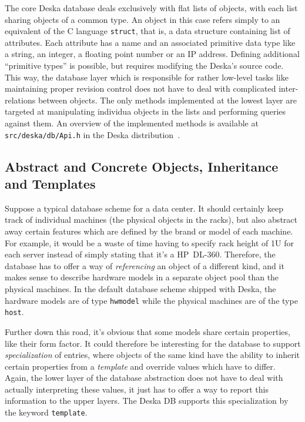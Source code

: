 \documentclass[a4paper]{jpconf}
\begin{document}
The core Deska database deals exclusively with flat lists of objects, with each list sharing objects of a common type.  An object in this case refers simply to an
equivalent of the C language {\tt struct}, that is, a data structure containing list of attributes.  Each attribute has a name and an
associated primitive data type like a string, an integer, a floating point number or an IP address.  Defining additional ``primitive
types'' is possible, but requires modifying the Deska's source code.  This way, the database layer which is responsible for rather
low-level tasks like maintaining proper revision control does not have to deal with complicated inter-relations between objects.  The
only methods implemented at the lowest layer are targeted at manipulating individua objects in the lists and performing queries against
them.  An overview of the implemented methods is available at {\tt src/deska/db/Api.h} in the Deska distribution~\cite{deska-project}.

\subsection{Abstract and Concrete Objects, Inheritance and Templates}

Suppose a typical database scheme for a data center.  It should certainly keep track of individual machines (the physical objects in
the racks), but also abstract away certain features which are defined by the brand or model of each machine.  For example, it would be
a waste of time having to specify rack height of 1U for each server instead of simply stating that it's a HP~DL-360.  Therefore, the
database has to offer a way of {\em referencing} an object of a different kind, and it makes sense to describe hardware models in a
separate object pool than the physical machines.  In the default database scheme shipped with Deska, the hardware models are of type
{\tt hwmodel} while the physical machines are of the type {\tt host}.

Further down this road, it's obvious that some models share certain properties, like their form factor.  It could therefore be
interesting for the database to support {\em specialization} of entries, where objects of the same kind have the ability to inherit
certain properties from a {\em template} and override values which have to differ.  Again, the lower layer of the database abstraction
does not have to deal with actually interpreting these values, it just has to offer a way to report this information to the upper
layers.  The Deska DB supports this specialization by the keyword {\tt template}.
\end{document}
